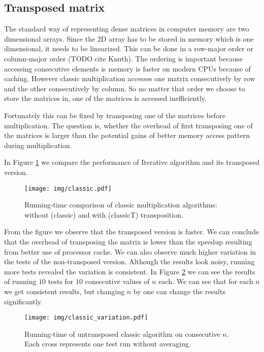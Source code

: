 \documentclass[a4paper,11pt]{article}
\begin{document}
\subsection{Transposed matrix}
\label{classic_transposed}
The standard way of representing dense matrices in computer memory are two dimensional arrays. Since the 2D array has to be stored in memory which is one dimensional, it needs to be linearized. This can be done in a row-major order or column-major order (TODO cite Knuth). The ordering is important because accessing consecutive elements is memory is faster on modern CPUs because of caching. However classic multiplication accesses one matrix consecutively by row and the other consecutively by column. So no matter that order we choose to store the matrices in, one of the matrices is accessed inefficiently.

Fortunately this can be fixed by transposing one of the matrices before multiplication. The question is, whether the overhead of first transposing one of the matrices is larger than the potential gains of better memory access pattern during multiplication.

In Figure \ref{fig:classic} we compare the performance of Iterative algorithm and its transposed version. 

\begin{figure}[h]
\centering
\texttt{[image: img/classic.pdf]}
\caption{Running-time comparison of classic multiplication algorithms: without (\textsf{classic}) and with (\textsf{classicT}) transposition.}
\label{fig:classic}
\end{figure}

From the figure we observe that the transposed version is faster. We can conclude that the overhead of transposing the matrix is lower than the speedup resulting from better use of processor cache.
We can also observe much higher variation in the tests of the non-transposed version. Although the results look noisy, running more tests revealed the variation is consistent. In Figure \ref{fig:classic_var} we can see the results of running $10$ tests for $10$ consecutive values of $n$ each. We can see that for each $n$ we get consistent results, but changing $n$ by one can change the results significantly.  

\begin{figure}[h]
\centering
\texttt{[image: img/classic\_variation.pdf]}

\caption{Running-time of untransposed classic algorithm on consecutive $n$. Each cross represents one test run without averaging.}
\label{fig:classic_var}
\end{figure}
\end{document}
